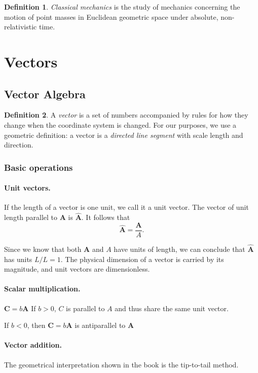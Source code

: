\documentclass{article}
\numberwithin{theorem}{section}
\numberwithin{corollary}{section}
\numberwithin{postulate}{section}
\numberwithin{lemma}{section}
\theoremstyle{definition}
\numberwithin{definition}{section}
\newtheorem*{definition*}{Definition}
\theoremstyle{remark}
\renewcommand{\vec}[1]{\mathbf{#1}}
\let\oldhat\hat
\renewcommand{\hat}[1]{\oldhat{\mathbf{#1}}}
\begin{document}
\begin{definition*}
  \emph{Classical mechanics} is the study of mechanics concerning the motion of
  point masses in Euclidean geometric space under absolute, non-relativistic
  time.
\end{definition*}

\section{Vectors}

\subsection{Vector Algebra}

\begin{definition*}
  A \emph{vector} is a set of numbers accompanied by rules for how they change
  when the coordinate system is changed. For our purposes, we use a geometric
  definition: a vector is a \emph{directed line segment} with scale length and
  direction.
\end{definition*}

\subsubsection{Basic operations}

\paragraph{Unit vectors.} If the length of a vector is one unit, we call it a
unit vector. The vector of unit length parallel to $\vec{A}$ is $\hat{A}$. It
follows that \[
  \hat{A} = \frac{\vec{A}}{A}.
\]

Since we know that both $\vec{A}$ and $A$ have units of length, we can conclude
that $\hat{A}$ has units $L/L = 1$. The physical dimension of a vector is
carried by its magnitude, and unit vectors are dimensionless.

\paragraph{Scalar multiplication.} $\vec{C} = b\vec{A}$ If $b > 0$, $C$ is
parallel to $A$ and thus share the same unit vector.

If $b < 0$, then $\vec{C} = b\vec{A}$ is antiparallel to $\vec{A}$ 

\paragraph{Vector addition.} The geometrical interpretation shown in the book is
the tip-to-tail method.
\end{document}
